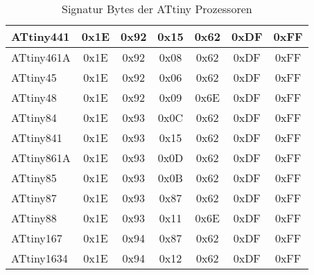 \begin{table}[H]
\begin{center}
\begin{tabular}{| l | c | c | c || c | c | c |}
    \hline
ATtiny441  & 0x1E & 0x92  & 0x15 & 0x62 & 0xDF & 0xFF \\
    \hline
ATtiny461A & 0x1E & 0x92  & 0x08 & 0x62 & 0xDF & 0xFF \\
    \hline
ATtiny45   & 0x1E & 0x92  & 0x06 & 0x62 & 0xDF & 0xFF \\
    \hline
ATtiny48   & 0x1E & 0x92  & 0x09 & 0x6E & 0xDF & 0xFF \\
    \hline
ATtiny84   & 0x1E & 0x93  & 0x0C & 0x62 & 0xDF & 0xFF \\
    \hline
ATtiny841  & 0x1E & 0x93  & 0x15 & 0x62 & 0xDF & 0xFF \\
    \hline
ATtiny861A & 0x1E & 0x93  & 0x0D & 0x62 & 0xDF & 0xFF \\
    \hline
ATtiny85   & 0x1E & 0x93  & 0x0B & 0x62 & 0xDF & 0xFF \\
    \hline
ATtiny87   & 0x1E & 0x93  & 0x87 & 0x62 & 0xDF & 0xFF \\
    \hline
ATtiny88   & 0x1E & 0x93  & 0x11 & 0x6E & 0xDF & 0xFF \\
    \hline
ATtiny167  & 0x1E & 0x94  & 0x87 & 0x62 & 0xDF & 0xFF \\
    \hline
ATtiny1634 & 0x1E & 0x94  & 0x12 & 0x62 & 0xDF & 0xFF \\
    \hline
    \end{tabular}
  \end{center}
  \caption{Signatur Bytes der ATtiny Prozessoren}
  \label{tab:tinySignature}
\end{table}


